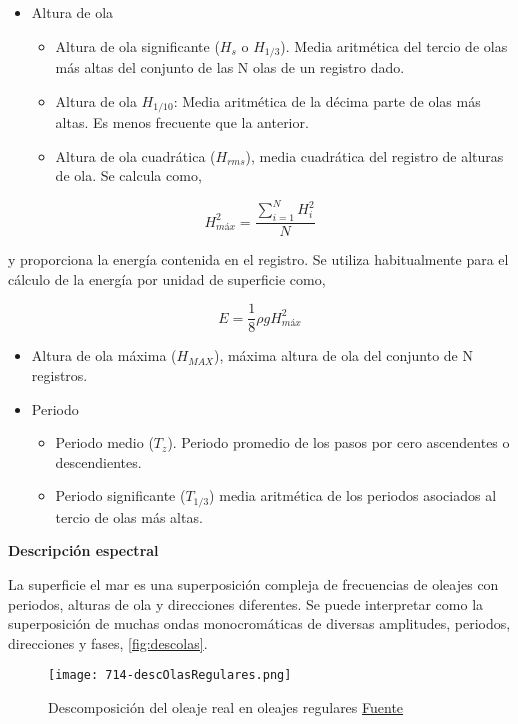 \begin{itemize}
\item
  Altura de ola

  \begin{itemize}
  \item
    Altura de ola significante (\(H_s\) o \(H_{1/3}\)). Media aritmética
    del tercio de olas más altas del conjunto de las N olas de un
    registro dado.
  \item
    Altura de ola \(H_{1/10}\): Media aritmética de la décima parte de
    olas más altas. Es menos frecuente que la anterior.
  \item
    Altura de ola cuadrática (\(H_{rms}\)), media cuadrática del
    registro de alturas de ola. Se calcula como,
  \end{itemize}
\end{itemize}

\[H^2_{máx}=\frac{\sum_{i=1}^N H^2_i}{N}\]

y proporciona la energía contenida en el registro. Se utiliza
habitualmente para el cálculo de la energía por unidad de superficie
como,

\[E=\frac{1}{8}\rho g H^2_{máx}\]

\begin{itemize}
\item
  Altura de ola máxima (\(H_{MAX}\)), máxima altura de ola del conjunto
  de N registros.
\item
  Periodo

  \begin{itemize}
  \item
    Periodo medio (\(T_z\)). Periodo promedio de los pasos por cero
    ascendentes o descendientes.
  \item
    Periodo significante (\(T_{1/3}\)) media aritmética de los periodos
    asociados al tercio de olas más altas.
  \end{itemize}
\end{itemize}

\textbf{Descripción espectral}\label{header-n336}

La superficie el mar es una superposición compleja de frecuencias de
oleajes con periodos, alturas de ola y direcciones diferentes. Se puede
interpretar como la superposición de muchas ondas monocromáticas de
diversas amplitudes, periodos, direcciones y fases, \autoref{fig:descolas}.

\begin{figure}
\centering
\texttt{[image: 714-descOlasRegulares.png]}
\caption[Despomposición oleaje real]{Descomposición del oleaje real en oleajes regulares \href{www.carbontrust.co.uk}{Fuente}}
\label{fig:descolas}
\end{figure}


